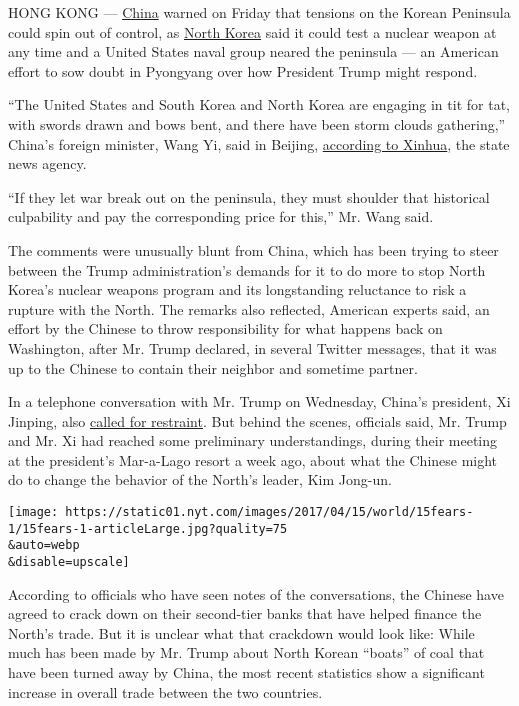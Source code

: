 HONG KONG ---
\href{https://www.nytimes.com/topic/destination/china?inline=nyt-geo}{China}
warned on Friday that tensions on the Korean Peninsula could spin out of
control, as
\href{https://www.nytimes.com/topic/destination/north-korea?8qa}{North
Korea} said it could test a nuclear weapon at any time and a United
States naval group neared the peninsula --- an American effort to sow
doubt in Pyongyang over how President Trump might respond.

``The United States and South Korea and North Korea are engaging in tit
for tat, with swords drawn and bows bent, and there have been storm
clouds gathering,'' China's foreign minister, Wang Yi, said in Beijing,
\href{http://news.xinhuanet.com/politics/2017-04/14/c_1120812558.htm}{according
to Xinhua}, the state news agency.

``If they let war break out on the peninsula, they must shoulder that
historical culpability and pay the corresponding price for this,'' Mr.
Wang said.

The comments were unusually blunt from China, which has been trying to
steer between the Trump administration's demands for it to do more to
stop North Korea's nuclear weapons program and its longstanding
reluctance to risk a rupture with the North. The remarks also reflected,
American experts said, an effort by the Chinese to throw responsibility
for what happens back on Washington, after Mr. Trump declared, in
several Twitter messages, that it was up to the Chinese to contain their
neighbor and sometime partner.

In a telephone conversation with Mr. Trump on Wednesday, China's
president, Xi Jinping, also
\href{http://www.fmprc.gov.cn/mfa_eng/zxxx_662805/t1453741.shtml}{called
for restraint}. But behind the scenes, officials said, Mr. Trump and Mr.
Xi had reached some preliminary understandings, during their meeting at
the president's Mar-a-Lago resort a week ago, about what the Chinese
might do to change the behavior of the North's leader, Kim Jong-un.

\texttt{[image: https://static01.nyt.com/images/2017/04/15/world/15fears-1/15fears-1-articleLarge.jpg?quality=75\\\&auto=webp\\\&disable=upscale]}

According to officials who have seen notes of the conversations, the
Chinese have agreed to crack down on their second-tier banks that have
helped finance the North's trade. But it is unclear what that crackdown
would look like: While much has been made by Mr. Trump about North
Korean ``boats'' of coal that have been turned away by China, the most
recent statistics show a significant increase in overall trade between
the two countries.

